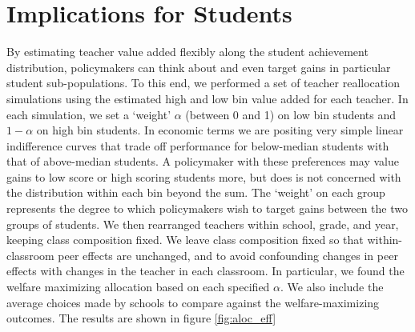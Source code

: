 \documentclass[12pt]{article}
\theoremstyle{definition}
\theoremstyle{definition}
\theoremstyle{definition}
\theoremstyle{definition}
\begin{document}

\section{Implications for Students} \label{swell}

By estimating teacher value added flexibly along the student achievement distribution, policymakers can think about and even target gains in particular student sub-populations. To this end, we performed a set of teacher reallocation simulations using the estimated high and low bin value added for each teacher. In each simulation, we set a ‘weight’ $\alpha$ (between 0 and 1) on low bin students and $1 - \alpha$ on high bin students. In economic terms we are positing very simple linear indifference curves that trade off performance for below-median students with that of above-median students. A policymaker with these preferences may value gains to low score or high scoring students more, but does is not concerned with the distribution within each bin beyond the sum. The ‘weight’ on each group represents the degree to which policymakers wish to target gains between the two groups of students. We then rearranged teachers within school, grade, and year, keeping class composition fixed. We leave class composition fixed so that within-classroom peer effects are unchanged, and to avoid confounding changes in peer effects with changes in the teacher in each classroom. In particular, we found the welfare maximizing allocation based on each specified $\alpha$. We also include the average choices made by schools to compare against the welfare-maximizing outcomes. The results are shown in figure \ref{fig:aloc_eff}
\end{document}
